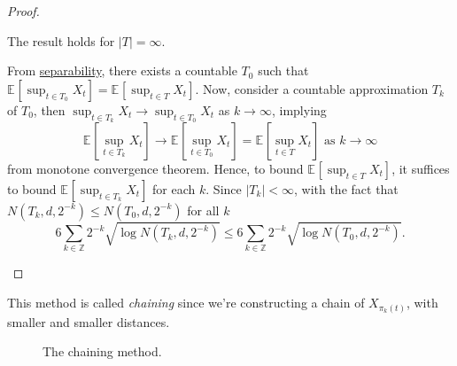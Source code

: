 \begin{proof}
	\begin{claim}
		The result holds for \(\vert T \vert = \infty \).
	\end{claim}
	\begin{explanation}
		From \hyperref[def:separable]{separability}, there exists a countable \(T_0\) such that \(\mathbb{E}_{}\left[\sup _{t\in T_0} X_t \right] = \mathbb{E}_{}\left[\sup _{t\in T} X_t \right] \). Now, consider a countable approximation \(T_k\) of \(T_0\), then \(\sup _{t\in T_k} X_t \to \sup _{t\in T_0} X_t \) as \(k \to \infty\), implying
		\[
			\mathbb{E}_{}\left[\sup _{t\in T_k} X_t \right] \to  \mathbb{E}_{}\left[\sup _{t\in T_0} X_t \right] = \mathbb{E}_{}\left[\sup _{t\in T} X_t \right] \text{ as }k \to \infty
		\]
		from monotone convergence theorem. Hence, to bound \(\mathbb{E}_{}\left[\sup _{t\in T} X_t \right] \), it suffices to bound \(\mathbb{E}_{}\left[\sup _{t\in T_k} X_t \right] \) for each \(k\). Since \(\vert T_k \vert < \infty \), with the fact that \(N(T_k, d, 2^{-k}) \leq N(T_0, d, 2^{-k})\) for all \(k\)
		\[
			6 \sum_{k\in \mathbb{Z} } 2^{-k} \sqrt{\log N(T_k, d, 2^{-k})} \leq 6 \sum_{k\in \mathbb{Z} } 2^{-k} \sqrt{\log N(T_0, d, 2^{-k})} .
		\]
	\end{explanation}
\end{proof}

\begin{note}
	This method is called \emph{chaining} since we're constructing a chain of \(X_{\pi _{k}(t)}\), with smaller and smaller distances.
	\begin{figure}[H]
		\centering
		\caption{The chaining method.}
		\label{fig:chaining}
	\end{figure}
\end{note}

